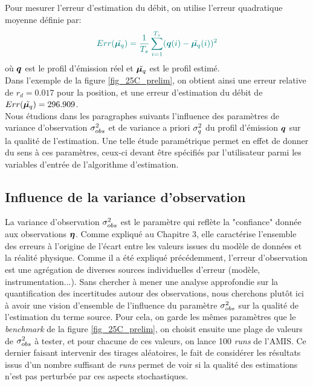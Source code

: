 Pour mesurer l'erreur d'estimation du débit, on utilise l'erreur quadratique moyenne définie par:
 \begin{equation}
 \NdFS{
	 Err(\tilde{\VecMeanQ}) = \dfrac{1}{T_s} \sum\limits_{i=1}^{T_s}(\VecQSource(i) - \tilde{\VecMeanQ}(i))^2
	}
 \end{equation}
 où ${\bm{q}}$ est le profil d'émission réel et $\tilde{{\bm{\mu}_q}}$ est le profil estimé.\\
 
 Dans l'exemple de la figure \ref{fig_25C_prelim}, on obtient ainsi une erreur relative de $r_d = 0.017$ pour la position, et une erreur d'estimation du débit de $Err(\tilde{{\bm{\mu}_q}}) = 296.909$. \\
 
 Nous étudions dans les paragraphes suivants l'influence des paramètres de variance d'observation ${\sigma_{obs}^2}$ et de variance a priori $\sigma_q^2$ du profil d'émission ${\bm{q}}$ sur la qualité de l'estimation. Une telle étude paramétrique permet en effet de donner du sens à ces paramètres, ceux-ci devant être spécifiés par l'utilisateur parmi les variables d'entrée de l'algorithme d'estimation. 
 
 \subsection{Influence de la variance d'observation}
 
 La variance d'observation ${\sigma_{obs}^2}$ est le paramètre qui reflète la "confiance" donnée aux observations ${\bm{\eta}}$. Comme expliqué au Chapitre 3, elle caractérise l'ensemble des erreurs à l'origine de l'écart entre les valeurs issues du modèle de données et la réalité physique. Comme il a été expliqué précédemment, l'erreur d'observation est une agrégation de diverses sources individuelles d'erreur (modèle, instrumentation...). Sans chercher à mener une analyse approfondie sur la quantification des incertitudes autour des observations, nous cherchons plutôt ici à avoir une vision d'ensemble de l'influence du paramètre ${\sigma_{obs}^2}$ sur la qualité de l'estimation du terme source. Pour cela, on garde les mêmes paramètres que le \textit{benchmark} de la figure \ref{fig_25C_prelim}, on choisit ensuite une plage de valeurs de ${\sigma_{obs}^2}$ à tester, et pour chacune de ces valeurs, on lance 100 \textit{runs} de l'AMIS. Ce dernier faisant intervenir des tirages aléatoires, le fait de considérer les résultats issus d'un nombre suffisant de \textit{runs} permet de voir si la qualité des estimations n'est pas perturbée par ces aspects stochastiques. 
   
